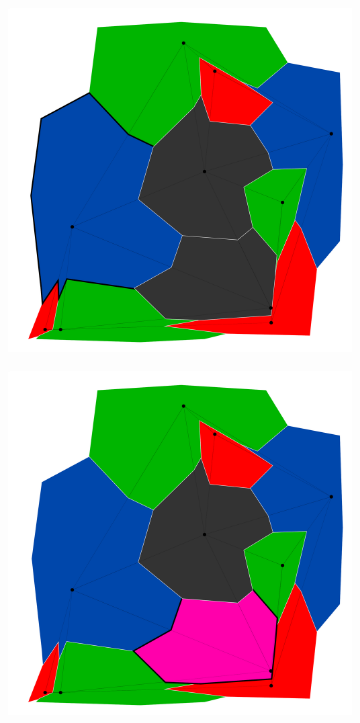 \documentclass{article}
\begin{document}
\begin{figure}[h!]
\begin{subfigure}{0.18\textwidth}
				\caption{}
				\label{bt2}
			\end{subfigure}
			\;
			\begin{subfigure}{0.18\textwidth}
				\centering
				\includegraphics[width=\textwidth]{images/sequences/simple_backtracking/bt_simple_I00015}
				\caption{}
				\label{bt3}
			\end{subfigure}
			\;
			\begin{subfigure}{0.18\textwidth}
				\centering
				\includegraphics[width=\textwidth]{images/sequences/simple_backtracking/bt_simple_I00019}

\end{subfigure}
\end{figure}
\end{document}

